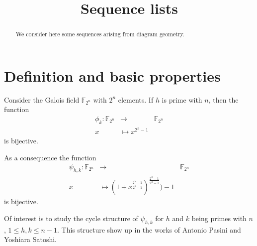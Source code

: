 \documentclass[12pt]{article}
\title{Sequence lists}
\begin{document}
\newcommand{\RR}{\ensuremath{\mathbb{R}}}
\newcommand{\NN}{\ensuremath{\mathbb{N}}}
\newcommand{\QQ}{\ensuremath{\mathbb{Q}}}
\newcommand{\CC}{\ensuremath{\mathbb{C}}}
\newcommand{\ZZ}{\ensuremath{\mathbb{Z}}}
\newcommand{\TT}{\ensuremath{\mathbb{T}}}
\newcommand{\FF}{\ensuremath{\mathbb{F}}}
\newtheorem{prop}{Proposition}
\newtheorem{theorem}{Theorem}
\newtheorem{cor}{Corollary}
\newtheorem{lem}{Lemma}
\newtheorem{conjecture}{Conjecture}
\newtheorem{claim}{Claim}
\newtheorem{remark}{Remark}
\newtheorem{definition}{Definition}
\newtheorem{proposition}{Proposition}
\newcommand{\qed}{\hfill $\Box$ }
\newcommand{\proof}{\noindent{\bf Proof.}\ \ }


\maketitle


\begin{abstract}
We consider here some sequences arising from diagram geometry.
\end{abstract}


\section{Definition and basic properties}
Consider the Galois field $\FF_{2^n}$ with $2^n$ elements.
If $h$ is prime with $n$, then the function
\begin{equation*}
\begin{array}{rcl}
\phi_k:\FF_{2^n} &\rightarrow &\FF_{2^n}\\
x&\mapsto x^{2^h-1}
\end{array}
\end{equation*}
is bijective.

As a consequence the function
\begin{equation*}
\begin{array}{rcl}
\psi_{h,k}:\FF_{2^n} &\rightarrow &\FF_{2^n}\\
x&\mapsto (1+x^{\frac{2^h-1}{2^k-1}})^{\frac{2^k-1}{2^h-1}})-1
\end{array}
\end{equation*}
is bijective.

Of interest is to study the cycle structure of $\psi_{h,k}$ for $h$ and $k$ being primes with $n$, $1\leq h,k \leq n-1$.
This structure show up in the works of Antonio Pasini and Yoshiara Satoshi.


























\end{document}
